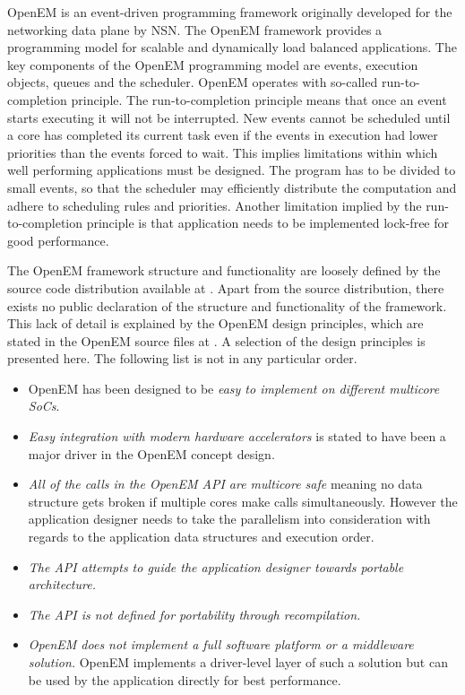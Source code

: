 OpenEM is an event-driven programming framework originally developed for the networking data plane by NSN. The OpenEM framework provides a programming model for scalable and dynamically load balanced applications. The key components of the OpenEM programming model are events, execution objects, queues and the scheduler. OpenEM operates with so-called run-to-completion principle. The run-to-completion principle means that once an event starts executing it will not be interrupted. New events cannot be scheduled until a core has completed its current task even if the events in execution had lower priorities than the events forced to wait. This implies limitations within which well performing applications must be designed. The program has to be divided to small events, so that the scheduler may efficiently distribute the computation and adhere to scheduling rules and priorities. Another limitation implied by the run-to-completion principle is that application needs to be implemented lock-free for good performance. \cite{openempage}

The OpenEM framework structure and functionality are loosely defined by the source code distribution available at \cite{openempage}. Apart from the source distribution, there exists no public declaration of the structure and functionality of the framework. This lack of detail is explained by the OpenEM design principles, which are stated in the OpenEM source files at \cite{openempage}. A selection of the design principles is presented here. The following list is not in any particular order.

\begin{itemize}
    \item OpenEM has been designed to be \emph{easy to implement on different multicore SoCs}.
    \item \emph{Easy integration with modern hardware accelerators} is stated to have been a major driver in the OpenEM concept design.
    \item \emph{All of the calls in the OpenEM API are multicore safe} meaning no data structure gets broken if multiple cores make calls simultaneously. However the application designer needs to take the parallelism into consideration with regards to the application data structures and execution order.
    \item \emph{The API attempts to guide the application designer towards portable architecture.}
    \item \emph{The API is not defined for portability through recompilation.}
    \item \emph{OpenEM does not implement a full software platform or a middleware solution.} OpenEM implements a driver-level layer of such a solution but can be used by the application directly for best performance.
\end{itemize}

